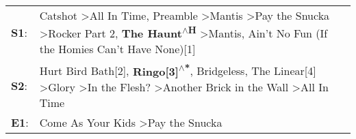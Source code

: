 \begin{supertabular}{p{0.03\textwidth}p{0.92\textwidth}}
 \textbf{S1}:  &  Catshot\textsuperscript{} \textgreater \enspace All In Time\textsuperscript{}, \enspace Preamble\textsuperscript{} \textgreater \enspace Mantis\textsuperscript{} \textgreater \enspace Pay the Snucka\textsuperscript{} \textgreater \enspace Rocker Part 2\textsuperscript{}, \enspace \textbf{The Haunt\textsuperscript{$\wedge$H}} \textgreater \enspace Mantis\textsuperscript{}, \enspace Ain't No Fun (If the Homies Can't Have None)[1]\textsuperscript{}  \enspace  \\
 \textbf{S2}:  &                                                              Hurt Bird Bath[2]\textsuperscript{}, \enspace \textbf{Ringo[3]\textsuperscript{$\wedge$*}}, \enspace Bridgeless\textsuperscript{}, \enspace The Linear[4]\textsuperscript{} \textgreater \enspace Glory\textsuperscript{} \textgreater \enspace In the Flesh?\textsuperscript{} \textgreater \enspace Another Brick in the Wall\textsuperscript{} \textgreater \enspace All In Time\textsuperscript{}  \enspace  \\
 \textbf{E1}:  &                                                                                                                                                                                                                                                                                                                                                                         Come As Your Kids\textsuperscript{} \textgreater \enspace Pay the Snucka\textsuperscript{}  \enspace  \\
\end{supertabular}
